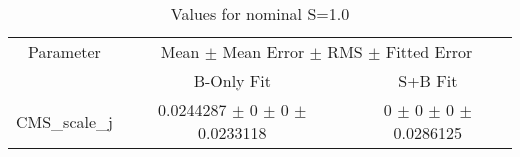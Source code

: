 \begin{table}
\centering
\caption{Values for nominal S=1.0}
\begin{tabular}{ccc}
\toprule
Parameter 	& \multicolumn{2}{c}{Mean $\pm$ Mean Error $\pm$ RMS $\pm$ Fitted Error}\\
 	& B-Only Fit & S+B Fit\\
\midrule
CMS\_scale\_j 	& \num{0.0244287} $\pm$ \num{0} $\pm$ \num{0} $\pm$ \num{0.0233118} 	& \num{0} $\pm$ \num{0} $\pm$ \num{0} $\pm$ \num{0.0286125}\\
\bottomrule
\end{tabular}
\end{table}